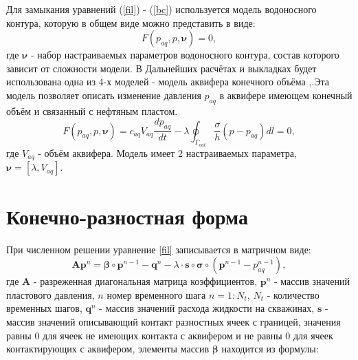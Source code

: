 \documentclass[14pt]{article}
\begin{document}
Для замыкания уравнений (\ref{fil}) - (\ref{bc}) используется модель водоносного контура, которую в общем виде можно представить в виде: 
\begin{equation} \label{f_aq}
F(p_{aq}, p,\boldsymbol{\nu})=0,
\end{equation}
где $\boldsymbol{\nu}$ - набор настраиваемых параметров водоносного контура, состав которого зависит от сложности модели. В Дальнейших расчётах и выкладках будет использована одна из 4-х моделей - модель аквифера конечного объёма \cite{dake},\cite{fet}.Эта модель позволяет описать изменение давления $p_{aq}$ в аквифере имеющем конечный объём и связанный с нефтяным пластом. 
\begin{equation} \label{aq_analit}
F(p_{aq}, p,\boldsymbol{\nu})=c_{aq}V_{aq}\frac{dp_{aq}}{dt} - \lambda\oint_{\Gamma_{out}}\frac{\sigma}{h}(p-p_{aq})dl = 0,
\end{equation}
где $V_{aq}$ - объём аквифера. Модель имеет 2 настраиваемых параметра, $\boldsymbol{\nu} = [\lambda, V_{aq}]$.

\section{Конечно-разностная форма} 
При численном решении уравнение \ref{fil} записывается в матричном виде:
\begin{equation} \label{fil_fin_def}
\boldsymbol{A}\boldsymbol{p}^n = \boldsymbol{\beta}\circ\boldsymbol{p}^{n-1} - \boldsymbol{q}^n - \lambda \cdot \boldsymbol{s}\circ\boldsymbol{\sigma}\circ (\boldsymbol{p}^{n-1}-p_{aq}^{n-1}),
\end{equation}
где $\boldsymbol{A}$ - разреженная диагональная матрица коэффициентов, $ \boldsymbol{p}^n $ - массив значений пластового давления, $ n $ номер временного шага $ n=1:N_t $,  $ N_t $ - количество временных шагов, $ \boldsymbol{q}^n $ - массив значений расхода жидкости на скважинах, $ \boldsymbol{s} $ - массив значений описывающий контакт разностных ячеек с границей, значения равны 0 для ячеек не имеющих контакта с аквифером и не равны 0 для ячеек контактирующих с аквифером, элементы массив $ \boldsymbol{\beta} $ находится из формулы:
\end{document}
